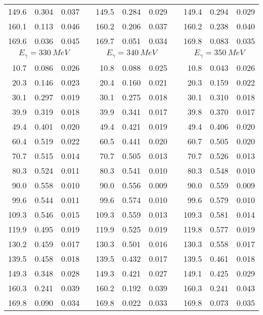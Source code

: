 \begin{table}[htbp]
\begin{center}
\begin{tabular}{|r|r|c|l|r|r|c|l|r|r|c|}
149.6 & 0.304 & 0.037 & & 149.5 & 0.284 & 0.029 & & 149.4 & 0.294 & 0.029 \\ 
160.1 & 0.113 & 0.046 & & 160.2 & 0.206 & 0.037 & & 160.2 & 0.238 & 0.040 \\ 
169.6 & 0.036 & 0.045 & & 169.7 & 0.051 & 0.034 & & 169.8 & 0.083 & 0.035 \\ 
\hline 
\hline 
\multicolumn{3}{|c|}{ $E_{\gamma}=330~MeV$} & & 
\multicolumn{3}{c|}{ $E_{\gamma}=340~MeV$} & & 
\multicolumn{3}{c|}{ $E_{\gamma}=350~MeV$} \\ 
\cline{1-3} 
\cline{5-7} 
\cline{9-11} 
 10.7 & 0.086 & 0.026 & &  10.8 & 0.088 & 0.025 & &  10.8 & 0.043 & 0.026 \\ 
 20.3 & 0.146 & 0.023 & &  20.4 & 0.160 & 0.021 & &  20.3 & 0.159 & 0.022 \\ 
 30.1 & 0.297 & 0.019 & &  30.1 & 0.275 & 0.018 & &  30.1 & 0.310 & 0.018 \\ 
 39.9 & 0.319 & 0.018 & &  39.9 & 0.341 & 0.017 & &  39.8 & 0.370 & 0.017 \\ 
 49.4 & 0.401 & 0.020 & &  49.4 & 0.421 & 0.019 & &  49.4 & 0.406 & 0.020 \\ 
 60.4 & 0.519 & 0.022 & &  60.5 & 0.441 & 0.020 & &  60.7 & 0.505 & 0.020 \\ 
 70.7 & 0.515 & 0.014 & &  70.7 & 0.505 & 0.013 & &  70.7 & 0.526 & 0.013 \\ 
 80.3 & 0.524 & 0.011 & &  80.3 & 0.541 & 0.010 & &  80.3 & 0.548 & 0.010 \\ 
 90.0 & 0.558 & 0.010 & &  90.0 & 0.556 & 0.009 & &  90.0 & 0.559 & 0.009 \\ 
 99.6 & 0.544 & 0.011 & &  99.6 & 0.574 & 0.010 & &  99.6 & 0.579 & 0.010 \\ 
109.3 & 0.546 & 0.015 & & 109.3 & 0.559 & 0.013 & & 109.3 & 0.581 & 0.014 \\ 
119.9 & 0.495 & 0.019 & & 119.9 & 0.525 & 0.019 & & 119.8 & 0.577 & 0.019 \\ 
130.2 & 0.459 & 0.017 & & 130.3 & 0.501 & 0.016 & & 130.3 & 0.558 & 0.017 \\ 
139.5 & 0.458 & 0.018 & & 139.5 & 0.432 & 0.017 & & 139.5 & 0.461 & 0.018 \\ 
149.3 & 0.348 & 0.028 & & 149.3 & 0.421 & 0.027 & & 149.1 & 0.425 & 0.029 \\ 
160.3 & 0.241 & 0.039 & & 160.2 & 0.192 & 0.039 & & 160.3 & 0.241 & 0.043 \\ 
169.8 & 0.090 & 0.034 & & 169.8 & 0.022 & 0.033 & & 169.8 & 0.073 & 0.035 \\ 
\cline{1-3} 
\cline{5-7} 
\cline{9-11} 
\end{tabular} 

\end{center} 
\end{table} 
